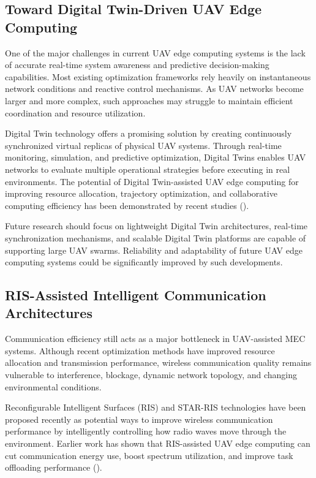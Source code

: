 \documentclass[a4paper, 12pt]{article}
\begin{document}
\subsection*{Toward Digital Twin-Driven UAV Edge Computing}
One of the major challenges in current UAV edge computing systems is the lack of accurate real-time system awareness and predictive decision-making capabilities. Most existing optimization frameworks rely heavily on instantaneous network conditions and reactive control mechanisms. As UAV networks become larger and more complex, such approaches may struggle to maintain efficient coordination and resource utilization.

Digital Twin technology offers a promising solution by creating continuously synchronized virtual replicas of physical UAV systems. Through real-time monitoring, simulation, and predictive optimization, Digital Twins enables UAV networks to evaluate multiple operational strategies before executing in real environments. The potential of Digital Twin-assisted UAV edge computing for improving resource allocation, trajectory optimization, and collaborative computing efficiency has been demonstrated by recent studies (\cite{Qiao2025DigitalTwin,Wang2025DigitalTwinSky}).

Future research should focus on lightweight Digital Twin architectures, real-time synchronization mechanisms, and scalable Digital Twin platforms are capable of supporting large UAV swarms. Reliability and adaptability of future UAV edge computing systems could be significantly improved by such developments.

\subsection*{RIS-Assisted Intelligent Communication Architectures}
Communication efficiency still acts as a major bottleneck in UAV-assisted MEC systems. Although recent optimization methods have improved resource allocation and transmission performance, wireless communication quality remains vulnerable to interference, blockage, dynamic network topology, and changing environmental conditions.

Reconfigurable Intelligent Surfaces (RIS) and STAR-RIS technologies have been proposed recently as potential ways to improve wireless communication performance by intelligently controlling how radio waves move through the environment. Earlier work has shown that RIS-assisted UAV edge computing can cut communication energy use, boost spectrum utilization, and improve task offloading performance (\cite{Yan2025RIS,Liu2026STARRIS,Zhao2026RISSurvey}).
\end{document}
